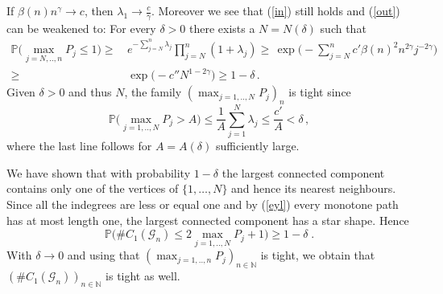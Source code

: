 \documentclass[12pt,a4paper]{article}
\numberwithin{equation}{section}
\begin{document}
If $\beta(n)n^\gamma \to c$, then $\lambda_1 \to \tfrac{c}{\gamma}$. Moreover we see that (\ref{in}) still holds and (\ref{out}) can be weakened to: For every $\delta>0$ there exists a  $N=N(\delta)$ such that 
\begin{equation} \label{wout}
\begin{aligned}
     \mathbb P \Big(\max_{j=N,..,n} P_j\le  1 \Big)  \ge \, &  e^{-\sum_{j=N}^n \lambda_j}\prod_{j=N}^n (1+\lambda_j)  \ge\,  \exp\Big(- \sum_{j=N}^n c' \beta(n)^2n^{2\gamma}j^{-2\gamma} \Big)\\\ge\,& \exp\big(- c'' N^{1-2\gamma})\ge 1-\delta\,.
\end{aligned}    
\end{equation}
Given $\delta>0$ and thus $N$, the family $(\max_{j=1,..,N}P_j)_n$ is tight since
\begin{equation} \label{tght}
    \mathbb P \Big(\max_{j=1,..,N} P_j> A\Big) \le \frac1A \sum_{j=1}^N \lambda_j \le \frac{c'}{A}<\delta \,,
\end{equation} 
where the last line follows for $A=A(\delta)$ sufficiently large. 
\pagebreak[3]

We have shown that with probability $1-\delta$ the largest connected component contains only one of the vertices of $\{1,\dots,N\}$ and hence its nearest neighbours. Since all the indegrees are less or equal one and by (\ref{eyl}) every monotone path has at most length one, the largest connected component has a star shape. Hence
$$ \mathbb P \Big(\#C_1(\mathscr{G}_n)\le2\max_{j=1,..,N} P_j+1\Big)\ge 1-\delta \;.$$
With $\delta\to0$ and using that $(\max_{j=1,..,n}P_j)_{n\in\mathbb N}$ is tight, we obtain that $(\#C_1(\mathscr{G}_n))_{n\in\mathbb N}$ is tight as well. 
\end{document}
